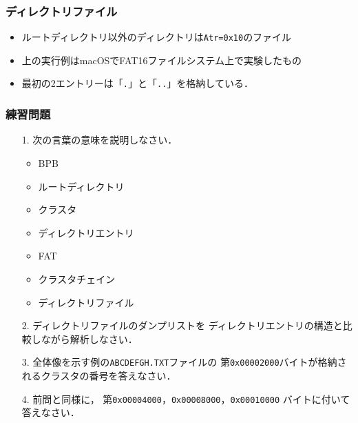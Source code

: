 \documentclass{beamer}                   %
\begin{document}
\begin{frame}
  \frametitle{ディレクトリファイル}
  \begin{itemize}
  \item ルートディレクトリ以外のディレクトリは\texttt{Atr=0x10}のファイル
  \item 上の実行例はmacOSでFAT16ファイルシステム上で実験したもの
  \item 最初の2エントリーは「\texttt{.}」と「\texttt{..}」を格納している．
  \end{itemize}
  \vfill
\end{frame}

\begin{frame}
  \frametitle{練習問題}
  \begin{enumerate}
  \item[1.] 次の言葉の意味を説明しなさい．
    \begin{itemize}
    \item BPB
    \item ルートディレクトリ
    \item クラスタ
    \item ディレクトリエントリ
    \item FAT
    \item クラスタチェイン
    \item ディレクトリファイル
    \end{itemize}

  \item[2.] ディレクトリファイルのダンプリストを
    ディレクトリエントリの構造と比較しながら解析しなさい．

  \item[3.] 全体像を示す例の\texttt{ABCDEFGH.TXT}ファイルの
    第\texttt{0x00002000}バイトが格納されるクラスタの番号を答えなさい．

  \item[4.] 前問と同様に，
    第\texttt{0x00004000}，\texttt{0x00008000}，\texttt{0x00010000}
    バイトに付いて答えなさい．
  \end{enumerate}
\end{frame}

\end{document}
